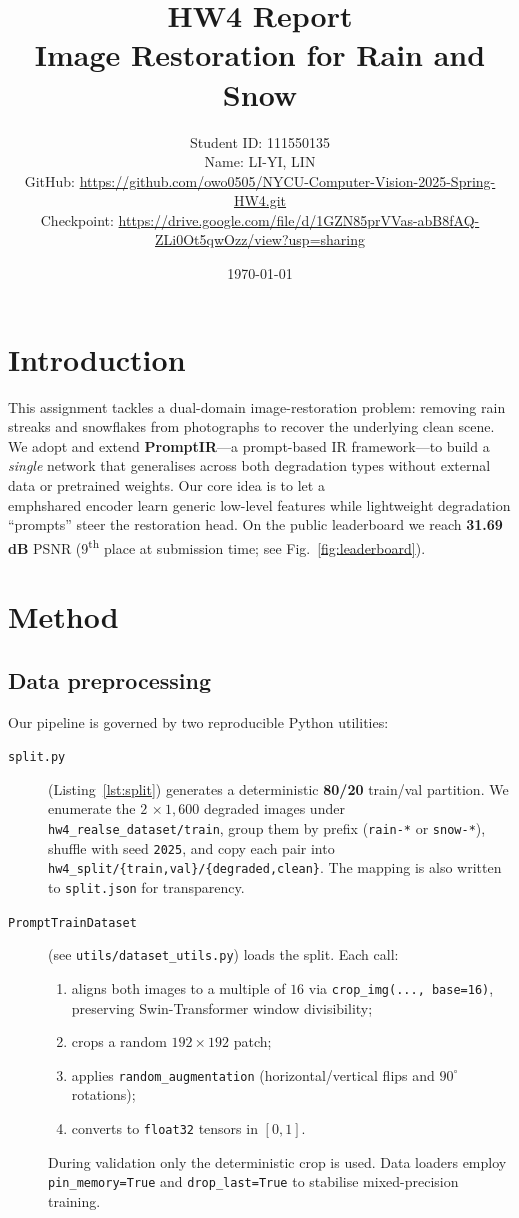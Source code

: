 \documentclass{article}
\title{HW4 Report \\ Image Restoration for Rain and Snow}
\author{%
  \begin{minipage}{0.8\textwidth}
    Student ID: 111550135\\
    Name: LI-YI, LIN\\
    GitHub: \url{https://github.com/owo0505/NYCU-Computer-Vision-2025-Spring-HW4.git}\\
    Checkpoint: \url{https://drive.google.com/file/d/1GZN85prVVas-abB8fAQ-ZLi0Ot5qwOzz/view?usp=sharing}
  \end{minipage}
}
\date{\today}
\begin{document}
\maketitle

\section{Introduction}
This assignment tackles a dual-domain image-restoration problem: removing rain streaks and snowflakes from photographs to recover the underlying clean scene.  We adopt and extend \textbf{PromptIR}\cite{promptir2023}—a prompt-based IR framework—to build a \textit{single} network that generalises across both degradation types without external data or pretrained weights.  Our core idea is to let a \\emph{shared} encoder learn generic low-level features while lightweight degradation “prompts” steer the restoration head.  On the public leaderboard we reach \textbf{31.69 dB} PSNR (9\textsuperscript{th} place at submission time; see Fig.~\ref{fig:leaderboard}).

\section{Method}

\subsection{Data preprocessing}\label{sec:data}
Our pipeline is governed by two reproducible Python utilities:
\begin{description}
  \item[\texttt{split.py}] (Listing~\ref{lst:split}) generates a deterministic \textbf{80/20} train/val partition.  We enumerate the $2\,\!\times\!1{,}600$ degraded images under \verb|hw4_realse_dataset/train|, group them by prefix (\verb|rain-*| or \verb|snow-*|), shuffle with seed \texttt{2025}, and copy each pair into \verb|hw4_split/{train,val}/{degraded,clean}|.  The mapping is also written to \verb|split.json| for transparency.
  \item[\texttt{PromptTrainDataset}] (see \verb|utils/dataset_utils.py|) loads the split.  Each call:
        \begin{enumerate}
            \item aligns both images to a multiple of $16$ via \verb|crop_img(..., base=16)|, preserving Swin-Transformer window divisibility;
            \item crops a random \textbf{$192\times192$} patch;
            \item applies \verb|random_augmentation| (horizontal/vertical flips and $90^{\circ}$ rotations);
            \item converts to \verb|float32| tensors in \([0,1]\).
        \end{enumerate}
        During validation only the deterministic crop is used.  Data loaders employ \verb|pin_memory=True| and \verb|drop_last=True| to stabilise mixed-precision training.
\end{description}
\end{document}
